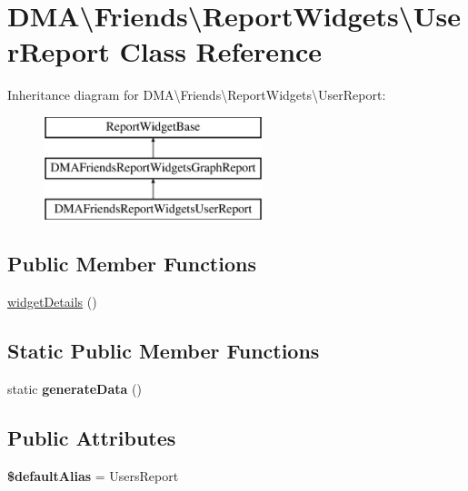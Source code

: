 \hypertarget{classDMA_1_1Friends_1_1ReportWidgets_1_1UserReport}{}\section{D\+M\+A\textbackslash{}Friends\textbackslash{}Report\+Widgets\textbackslash{}User\+Report Class Reference}
\label{classDMA_1_1Friends_1_1ReportWidgets_1_1UserReport}
Inheritance diagram for D\+M\+A\textbackslash{}Friends\textbackslash{}Report\+Widgets\textbackslash{}User\+Report\+:\begin{figure}[H]
\begin{center}
\leavevmode
\includegraphics[height=3.000000cm]{da/df6/classDMA_1_1Friends_1_1ReportWidgets_1_1UserReport}
\end{center}
\end{figure}
\subsection*{Public Member Functions}
\begin{DoxyCompactItemize}
\item 
\hyperlink{classDMA_1_1Friends_1_1ReportWidgets_1_1UserReport_afb50e76deecafa7bda9649240364043b}{widget\+Details} ()
\end{DoxyCompactItemize}
\subsection*{Static Public Member Functions}
\begin{DoxyCompactItemize}
\item 
\hypertarget{classDMA_1_1Friends_1_1ReportWidgets_1_1UserReport_a85b2c19f84b7061eaffafc4ff007d122}{}static {\bfseries generate\+Data} ()\label{classDMA_1_1Friends_1_1ReportWidgets_1_1UserReport_a85b2c19f84b7061eaffafc4ff007d122}

\end{DoxyCompactItemize}
\subsection*{Public Attributes}
\begin{DoxyCompactItemize}
\item 
\hypertarget{classDMA_1_1Friends_1_1ReportWidgets_1_1UserReport_a1005b685d8aef254f059c72c42e0ae39}{}{\bfseries \$default\+Alias} = \textquotesingle{}Users\+Report\textquotesingle{}\label{classDMA_1_1Friends_1_1ReportWidgets_1_1UserReport_a1005b685d8aef254f059c72c42e0ae39}

\end{DoxyCompactItemize}
